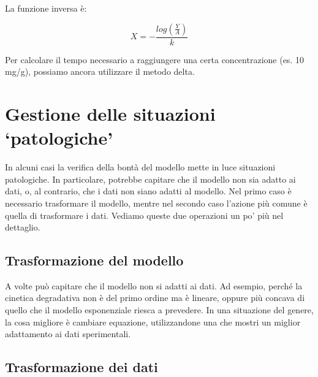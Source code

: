 \documentclass[a4paper,12pt,oneside]{book}
\newenvironment{Shaded}{}{}
\newcommand{\KeywordTok}[1]{#1}
\newcommand{\DataTypeTok}[1]{#1}
\newcommand{\StringTok}[1]{#1}
\newcommand{\CommentTok}[1]{#1}
\newcommand{\NormalTok}[1]{#1}
\begin{document}
La funzione inversa è:

\[X = - \frac{log \left( \frac{Y}{A} \right)}{k} \]

Per calcolare il tempo necessario a raggiungere una certa concentrazione (es. 10 mg/g), possiamo ancora utilizzare il metodo delta.

\begin{Shaded}
\end{Shaded}

\hypertarget{gestione-delle-situazioni-patologiche}{%
\section{Gestione delle situazioni `patologiche'}\label{gestione-delle-situazioni-patologiche}}

In alcuni casi la verifica della bontà del modello mette in luce situazioni patologiche. In particolare, potrebbe capitare che il modello non sia adatto ai dati, o, al contrario, che i dati non siano adatti al modello. Nel primo caso è necessario trasformare il modello, mentre nel secondo caso l'azione più comune è quella di trasformare i dati. Vediamo queste due operazioni un po' più nel dettaglio.

\hypertarget{trasformazione-del-modello}{%
\subsection{Trasformazione del modello}\label{trasformazione-del-modello}}

A volte può capitare che il modello non si adatti ai dati. Ad esempio, perché la cinetica degradativa non è del primo ordine ma è lineare, oppure più concava di quello che il modello esponenziale riesca a prevedere. In una situazione del genere, la cosa migliore è cambiare equazione, utilizzandone una che mostri un miglior adattamento ai dati sperimentali.

\hypertarget{trasformazione-dei-dati}{%
\subsection{Trasformazione dei dati}\label{trasformazione-dei-dati}}
\end{document}
